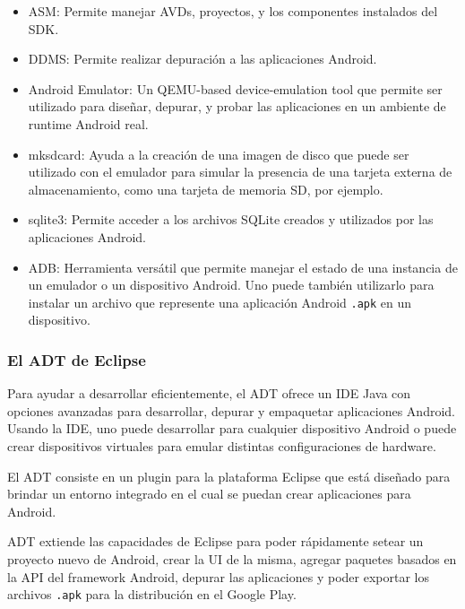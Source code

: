 \begin{itemize}
\item \acf{ASM}: Permite manejar \ac{AVD}s, proyectos, y los componentes instalados del \ac{SDK}.
\item \acf{DDMS}: Permite realizar depuraci\'on a las aplicaciones Android.
\item Android Emulator: Un QEMU-based device-emulation tool que permite ser utilizado para dise\~nar, depurar, y probar las aplicaciones en un ambiente de runtime Android real.
\item mksdcard: Ayuda a la creaci\'on de una imagen de disco que puede ser utilizado con el emulador para simular la presencia de una tarjeta externa de almacenamiento, como una tarjeta de memoria \ac{SD}, por ejemplo.
\item sqlite3: Permite acceder a los archivos SQLite creados y utilizados por las aplicaciones Android.
\item \ac{ADB}: Herramienta vers\'atil que permite manejar el estado de una instancia de un emulador o un dispositivo Android. Uno puede tambi\'en utilizarlo para instalar un archivo que represente una aplicaci\'on Android \texttt{.apk} en un dispositivo.
\end{itemize}

\subsubsection{El \acf{ADT} de Eclipse}
\label{subsubsec:android.tools.adt.1}

Para ayudar a desarrollar eficientemente, el \ac{ADT} ofrece un \ac{IDE} Java con opciones avanzadas para desarrollar, depurar y empaquetar aplicaciones Android. Usando la \ac{IDE}, uno puede desarrollar para cualquier dispositivo Android o puede crear dispositivos virtuales para emular distintas configuraciones de hardware.

El \ac{ADT} consiste en un plugin para la plataforma Eclipse\Si{\texttrademark} que est\'a dise\~nado para brindar un entorno integrado en el cual se puedan crear aplicaciones para Android.

\ac{ADT} extiende las capacidades de Eclipse\Si{\texttrademark} para poder r\'apidamente setear un proyecto nuevo de Android, crear la \ac{UI} de la misma, agregar paquetes basados en la \ac{API} del framework Android, depurar las aplicaciones y poder exportar los archivos \texttt{.apk} para la distribuci\'on en el Google Play\Si{\texttrademark}.~\cite{and.dev.adt}

